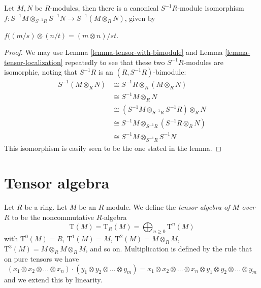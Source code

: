 \begin{lemma}
\label{lemma-tensor-product-localization}
Let $M,N$ be $R$-modules, then there is a canonical 
$S^{-1}R$-module isomorphism
$f:S^{-1}M\otimes_{S^{-1}R}S^{-1}N\rightarrow S^{-1}(M\otimes_{R} N)$, given by 
\begin{center}
$f((m/s)\otimes(n/t) = (m\otimes n)/st$.
\end{center}
\end{lemma}

\begin{proof}
We may use Lemma \ref{lemma-tensor-with-bimodule}
and Lemma \ref{lemma-tensor-localization} repeatedly to 
see that these two
$S^{-1}R$-modules are isomorphic, noting that $S^{-1}R$ is an 
$(R,S^{-1}R)$-bimodule:
\begin{align}
S^{-1}(M\otimes_{R} N) &\cong S^{-1}R\otimes_R (M\otimes_R N)\\
 &\cong S^{-1}M\otimes_R N\\
 &\cong (S^{-1}M\otimes_{S^{-1}R}S^{-1}R)\otimes_R N\\
 &\cong S^{-1}M\otimes_{S^{-1}R}(S^{-1}R\otimes_R N)\\
 &\cong S^{-1}M\otimes_{S^{-1}R}S^{-1}N
\end{align}
This isomorphism is easily seen to be the one stated in the lemma.
\end{proof}


















\section{Tensor algebra}
\label{section-tensor-algebra}

\noindent
Let $R$ be a ring. Let $M$ be an $R$-module.
We define the {\it tensor algebra of $M$ over $R$} to
be the noncommutative $R$-algebra
$$
\text{T}(M) = \text{T}_R(M) =
\bigoplus_{n \geq 0} \text{T}^n(M)
$$
with
$\text{T}^0(M) = R$, 
$\text{T}^1(M) = M$, 
$\text{T}^2(M) = M \otimes_R M$, 
$\text{T}^3(M) = M \otimes_R M \otimes_R M$, and so on.
Multiplication is defined by the rule that on pure tensors we have
$$
(x_1 \otimes x_2 \otimes \ldots \otimes x_n)
\cdot
(y_1 \otimes y_2 \otimes \ldots \otimes y_m)
=
x_1 \otimes x_2 \otimes \ldots \otimes x_n \otimes
y_1 \otimes y_2 \otimes \ldots \otimes y_m
$$
and we extend this by linearity.

